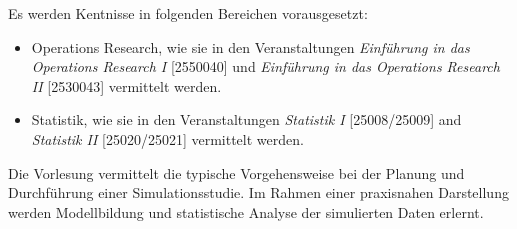 \begin{course}

\setdoclanguagegerman
{}



\coursehead


\label{cour_4641.dp_997}


\begin{styleenv}
\begin{assessment}

\end{assessment}

\begin{conditions}Es werden Kentnisse in folgenden Bereichen vorausgesetzt:

 \begin{itemize}\item Operations Research, wie sie in den Veranstaltungen \emph{Einführung in das Operations Research I} [2550040] und \emph{Einführung in das Operations Research II} [2530043] vermittelt werden.  \item Statistik, wie sie in den Veranstaltungen \emph{Statistik I} [25008/25009] and \emph{Statistik II} [25020/25021] vermittelt werden.  \end{itemize}\end{conditions}


\end{styleenv}

\begin{learningoutcomes}
Die Vorlesung vermittelt die typische Vorgehensweise bei der Planung und Durchführung einer Simulationsstudie. Im Rahmen einer praxisnahen Darstellung werden Modellbildung und statistische Analyse der simulierten Daten erlernt.


\end{learningoutcomes}


\end{course}
